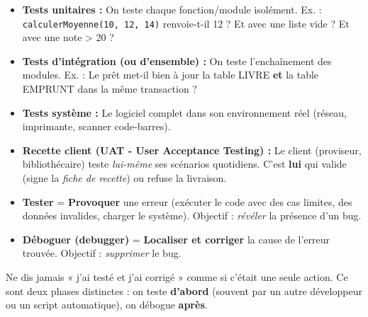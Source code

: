 \documentclass[11pt]{article}
\begin{document}
\begin{definition}
\begin{itemize}
    \item \textbf{Tests unitaires :} On teste chaque fonction/module isolément. Ex. : \texttt{calculerMoyenne(10, 12, 14)} renvoie-t-il 12 ? Et avec une liste vide ? Et avec une note > 20 ?
    \item \textbf{Tests d'intégration (ou d'ensemble) :} On teste l'enchaînement des modules. Ex. : Le prêt met-il bien à jour la table LIVRE \textbf{et} la table EMPRUNT dans la même transaction ?
    \item \textbf{Tests système :} Le logiciel complet dans son environnement réel (réseau, imprimante, scanner code-barres).
    \item \textbf{Recette client (UAT - User Acceptance Testing) :} Le client (proviseur, bibliothécaire) teste \emph{lui-même} ses scénarios quotidiens. C'est \textbf{lui} qui valide (signe la \emph{fiche de recette}) ou refuse la livraison.
\end{itemize}
\end{definition}

\begin{attention}
\begin{itemize}
    \item \textbf{Tester} = \textbf{Provoquer} une erreur (exécuter le code avec des cas limites, des données invalides, charger le système). Objectif : \emph{révéler} la présence d'un bug.
    \item \textbf{Déboguer (debugger)} = \textbf{Localiser et corriger} la cause de l'erreur trouvée. Objectif : \emph{supprimer} le bug.
\end{itemize}
Ne dis jamais « j'ai testé et j'ai corrigé » comme si c'était une seule action. Ce sont deux phases distinctes : on teste \textbf{d'abord} (souvent par un autre développeur ou un script automatique), on débogue \textbf{après}.
\end{attention}
\end{document}
